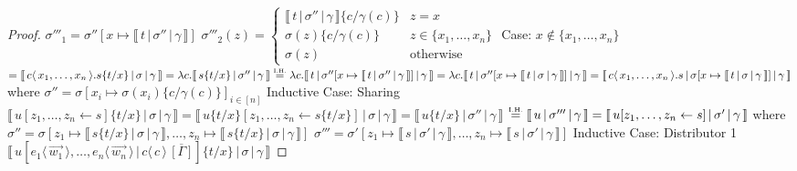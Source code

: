 \documentclass[a4paper,UKenglish,cleveref, autoref]{lipics-v2019}
\newcommand{\set}[1]{ \{ #1 \} }
\newcommand{\abs}[2]{\lambda #1 . #2}
\newcommand{\fake}[3]{#1 \langle \, #2 \, \rangle . #3}
\newcommand{\share}[3]{#1 [#2 \leftarrow #3]}
\newcommand{\dist}[5]{#1 [ #2 \, \vert \, \fakedist{#4}{#5} \, #3 ]}
\newcommand{\fakedist}[2]{#1 \langle \, #2 \, \rangle}
\newcommand{\sub}[3]{#1 \{ #2 / #3 \}}
\newcommand{\readbackwmap}[3]{\llbracket \, #1 \, \vert \, #2 \, \vert \, #3  \, \rrbracket }
\newcommand{\IH}{\stackrel{\hbox{\tiny I.H.}}{\hbox{=}}}
\begin{document}
\begin{proof}
\newline
\indent $\sigma'''_{1} = \sigma''[x \mapsto \readbackwmap{t}{\sigma''}{\gamma}]$
\newline
\indent $\sigma'''_{2}(z) = \begin{cases} \readbackwmap{t}{\sigma''}{\gamma} \sub{}{c}{\gamma(c)} & z = x \\ \sigma(z) \sub{}{c}{\gamma(c)} & z \in \set{x_{1}, \dots, x_{n}} \\ \sigma(z) & \text{otherwise} \end{cases}$
\newline
\newline
\indent Case: $x \not\in \set{x_{1}, \dots, x_{n}}$
\newline
\indent $= \readbackwmap{\fake{c}{x_{1}, \dots, x_{n}}{s \sub{}{t}{x}}}{\sigma}{\gamma} = \abs{c}{\readbackwmap{s \sub{}{t}{x}}{\sigma''}{\gamma}} \IH \abs{c}{\readbackwmap{t}{\sigma''[x \mapsto \readbackwmap{t}{\sigma''}{\gamma}]}{\gamma}} = \abs{c}{\readbackwmap{t}{\sigma''[x \mapsto \readbackwmap{t}{\sigma}{\gamma}]}{\gamma}} = \readbackwmap{\fake{c}{x_{1}, \dots, x_{n}}{s}}{\sigma[x \mapsto \readbackwmap{t}{\sigma}{\gamma}]}{\gamma}$
\newline
\indent where
\newline
\indent $\sigma'' = \sigma[x_{i} \mapsto \sigma(x_{i}) \sub{}{c}{\gamma(c)}]_{i \in [n]}$
\newline
\newline
Inductive Case: Sharing
\newline
$\readbackwmap{\share{u}{z_{1}, \dots, z_{n}}{s} \sub{}{t}{x}}{\sigma}{\gamma} = \readbackwmap{\share{u \sub{}{t}{x}}{z_{1}, \dots, z_{n}}{s \sub{}{t}{x}} }{\sigma}{\gamma} = \readbackwmap{u \sub{}{t}{x}}{\sigma''}{\gamma}$
\newline
$\IH \readbackwmap{u}{\sigma'''}{\gamma} = \readbackwmap{\share{u}{z_{1}, \dots, z_{n}}{s}}{\sigma'}{\gamma}$
\newline
where 
\newline
$\sigma'' = \sigma [z_{1} \mapsto \readbackwmap{s \sub{}{t}{x}}{\sigma}{\gamma} , \dots , z_{n} \mapsto \readbackwmap{s \sub{}{t}{x}}{\sigma}{\gamma} ]$
\newline
$\sigma''' = \sigma' [z_{1} \mapsto \readbackwmap{s}{\sigma'}{\gamma} , \dots , z_{n} \mapsto \readbackwmap{s }{\sigma'}{\gamma} ]$
\newline
\newline
Inductive Case: Distributor 1
\newline
$\readbackwmap{\dist{u}{\fakedist{e_{1}}{\vec{w_{1}}}, \dots, \fakedist{e_{n}}{\vec{w_{n}}}}{\overline{[\Gamma]}}{c}{c} \sub{}{t}{x}}{\sigma}{\gamma}$

\end{proof}
\end{document}
